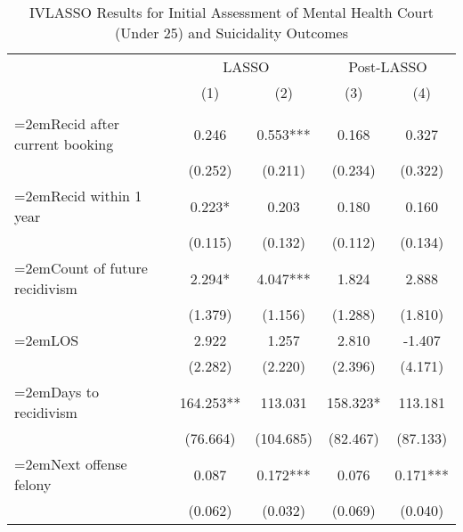 \begin{table}[htbp]\centering
\small
\caption{IVLASSO Results for Initial Assessment of Mental Health Court (Under 25) and Suicidality Outcomes}\label{tab:ivlasso}
\begin{center}
\begin{adjustbox}{width=\textwidth, totalheight=\baselineskip,keepaspectratio}
\begin{threeparttable}
\begin{tabular}{p{}*{4}{c}}
\toprule
                    &\multicolumn{2}{c}{LASSO}      &\multicolumn{2}{c}{Post-LASSO} \\\cmidrule(lr){2-3}\cmidrule(lr){4-5}
                    &\multicolumn{1}{c}{(1)}&\multicolumn{1}{c}{(2)}&\multicolumn{1}{c}{(3)}&\multicolumn{1}{c}{(4)}\\
                    &\multicolumn{1}{c}{}&\multicolumn{1}{c}{}&\multicolumn{1}{c}{}&\multicolumn{1}{c}{}\\
\midrule
{\hangindent=2emRecid after current booking}&       0.246   &       0.553***&       0.168   &       0.327   \\
                    &     (0.252)   &     (0.211)   &     (0.234)   &     (0.322)   \\
{\hangindent=2emRecid within 1 year}&       0.223*  &       0.203   &       0.180   &       0.160   \\
                    &     (0.115)   &     (0.132)   &     (0.112)   &     (0.134)   \\
{\hangindent=2emCount of future recidivism}&       2.294*  &       4.047***&       1.824   &       2.888   \\
                    &     (1.379)   &     (1.156)   &     (1.288)   &     (1.810)   \\
{\hangindent=2emLOS}&       2.922   &       1.257   &       2.810   &      -1.407   \\
                    &     (2.282)   &     (2.220)   &     (2.396)   &     (4.171)   \\
{\hangindent=2emDays to recidivism}&     164.253** &     113.031   &     158.323*  &     113.181   \\
                    &    (76.664)   &   (104.685)   &    (82.467)   &    (87.133)   \\
{\hangindent=2emNext offense felony}&       0.087   &       0.172***&       0.076   &       0.171***\\
                    &     (0.062)   &     (0.032)   &     (0.069)   &     (0.040)   \\

\end{tabular}
\end{threeparttable}
\end{adjustbox}
\end{center}
\end{table}
